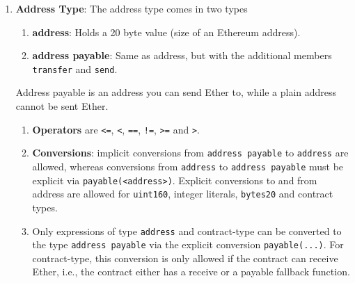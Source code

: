 \begin{enumerate}
\item\textbf{Address Type}: The address type comes in two types
    \begin{enumerate}
    \item\textbf{address}: Holds a 20 byte value (size of an Ethereum address).
    \item\textbf{address payable}: Same as address, but with the additional members \verb|transfer| and \verb|send|.
    \end{enumerate}
    Address payable is an address you can send Ether to, while a plain address cannot be sent Ether.
    \begin{enumerate}
    \item\textbf{Operators} are \verb|<=|, \verb|<|, \verb|==|, \verb|!=|, \verb|>=| and \verb|>|.
    \item\textbf{Conversions}: implicit conversions from \verb|address payable| to \verb|address| are allowed, whereas conversions from \verb|address| to \verb|address payable| must be explicit via \verb|payable(<address>)|. Explicit conversions to and from address are allowed for \verb|uint160|, integer literals, \verb|bytes20| and contract types.
    \item Only expressions of type \verb|address| and contract-type can be converted to the type \verb|address payable| via the explicit conversion \verb|payable(...)|. For contract-type, this conversion is only allowed if the contract can receive Ether, i.e., the contract either has a receive or a payable fallback function.
    \end{enumerate}


\end{enumerate}
